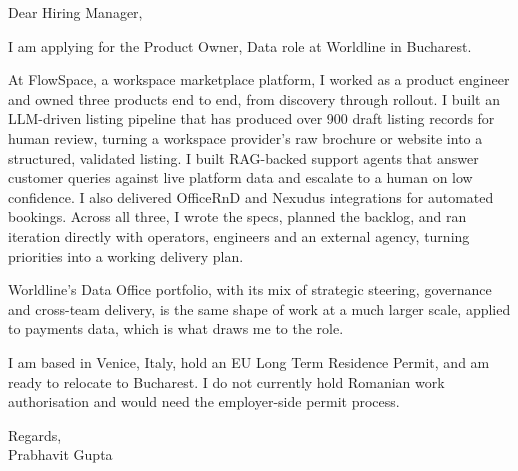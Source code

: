 \documentclass[a4paper,11pt]{article}
\begin{document}
Dear Hiring Manager,

I am applying for the Product Owner, Data role at Worldline in Bucharest.

At FlowSpace, a workspace marketplace platform, I worked as a product engineer and owned three products end to end, from discovery through rollout. I built an LLM-driven listing pipeline that has produced over 900 draft listing records for human review, turning a workspace provider's raw brochure or website into a structured, validated listing. I built RAG-backed support agents that answer customer queries against live platform data and escalate to a human on low confidence. I also delivered OfficeRnD and Nexudus integrations for automated bookings. Across all three, I wrote the specs, planned the backlog, and ran iteration directly with operators, engineers and an external agency, turning priorities into a working delivery plan.

Worldline's Data Office portfolio, with its mix of strategic steering, governance and cross-team delivery, is the same shape of work at a much larger scale, applied to payments data, which is what draws me to the role.

I am based in Venice, Italy, hold an EU Long Term Residence Permit, and am ready to relocate to Bucharest. I do not currently hold Romanian work authorisation and would need the employer-side permit process.

Regards,\\
Prabhavit Gupta
\end{document}
